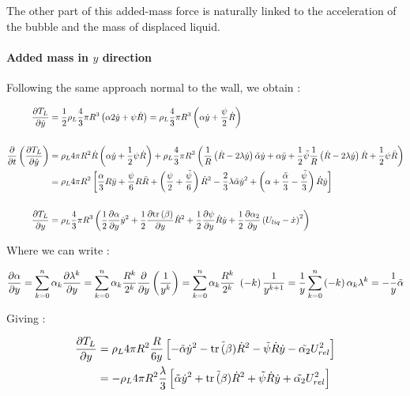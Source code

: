 The other part of this added-mass force is naturally linked to the acceleration of the bubble and the mass of displaced liquid. 


\paragraph{Added mass in $y$ direction}

Following the same approach normal to the wall, we obtain : 

\begin{align}
\frac{\partial T_{L}}{\partial \dot{y}}&=\frac{1}{2}\rho_{L}\frac{4}{3}\pi R^{3}\left( \alpha 2\dot{y}+\psi\dot{R} \right)=\rho_{L}\frac{4}{3}\pi R^{3}\left( \alpha \dot{y} + \frac{\psi}{2}\dot{R} \right)\\
\nonumber \\
\frac{\partial }{\partial t}\left( \frac{\partial T_{L}}{\partial \dot{y}} \right)&=\rho_{L}4\pi R^{2}\dot{R}\left( \alpha \dot{y} + \frac{1}{2} \psi \dot{R} \right)+\rho_{L}\frac{4}{3}\pi R^{3}\left( \frac{1}{R}\left( \dot{R}-2\lambda \dot{y} \right)\tilde{\alpha}\dot{y} +\alpha\ddot{y}+\frac{1}{2}\tilde{\psi}\frac{1}{R}\left( \dot{R}-2\lambda \dot{y} \right)\dot{R} +\frac{1}{2}\psi \ddot{R} \right)\\
&=\rho_{L}4\pi R^{2}\left[ \frac{\alpha}{3}R\ddot{y}+\frac{\psi}{6}R \ddot{R} + \left( \frac{\psi}{2} +\frac{\tilde{\psi}}{6} \right)\dot{R}^{2} -\frac{2}{3}\lambda \tilde{\alpha} \dot{y}^{2} + \left(  \alpha + \frac{\tilde{\alpha}}{3} - \frac{\tilde{\psi}}{3}  \right)\dot{R}\dot{y}  \right]\\
\nonumber \\
\frac{\partial T_{L}}{\partial y}&=\rho_{L}\frac{4}{3}\pi R^{3} \left(  \frac{1}{2} \frac{\partial \alpha}{\partial y}\dot{y}^{2} + \frac{1}{2} \frac{\partial \mathrm{tr}\left( \beta \right)}{\partial y}\dot{R}^{2}+\frac{1}{2}\frac{\partial \psi}{\partial y}\dot{R}\dot{y}+\frac{1}{2}\frac{\partial \alpha_{2}}{\partial y}\left( U_{liq}-\dot{x} \right)^{2}  \right) 
\end{align}

Where we can write :

\begin{align}
\frac{\partial \alpha}{\partial y}=\sum_{k=0}^{n}\alpha_{k}\frac{\partial \lambda^{k}}{\partial y} = \sum_{k=0}^{n}\alpha_{k}\frac{R^{k}}{2^{k}}\frac{\partial }{\partial y}\left( \frac{1}{y^{k}} \right)=\sum_{k=0}^{n}\alpha_{k}\frac{R^{k}}{2^{k}}~\left( -k \right)\frac{1}{y^{k+1}}=\frac{1}{y}\sum_{k=0}^{n}\left( -k \right)\alpha_{k}\lambda^{k}=-\frac{1}{y}\tilde{\alpha}
\end{align} 

Giving : 

\begin{align}
\frac{\partial T_{L}}{\partial y}&=\rho_{L}4\pi R^{2}\frac{R}{6y}\left[ -\tilde{\alpha}\dot{y}^{2}-\tilde{\mathrm{tr}\left( \beta \right)}\dot{R}^{2}-\tilde{\psi}\dot{R}\dot{y}-\tilde{\alpha_{2}}U_{rel}^{2} \right]\\
&=-\rho_{L}4\pi R^{2}\frac{\lambda}{3}\left[ \tilde{\alpha}\dot{y}^{2}+\tilde{\mathrm{tr}\left( \beta \right)}\dot{R}^{2}+\tilde{\psi}\dot{R}\dot{y}+\tilde{\alpha_{2}}U_{rel}^{2} \right]
\end{align}

